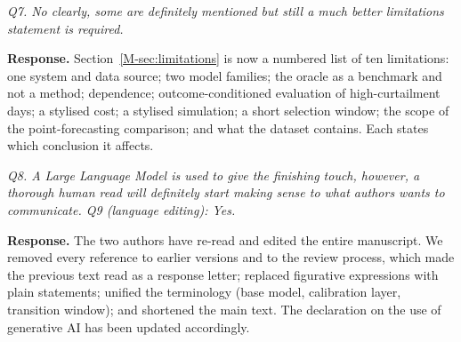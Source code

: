 \documentclass[11pt,a4paper]{article}
\newenvironment{revcomment}
  {\begin{mdframed}[backgroundcolor=quotebg,linecolor=quoterule,linewidth=0.4pt,
    innertopmargin=6pt,innerbottommargin=6pt,skipabove=8pt,skipbelow=8pt]\itshape}
  {\end{mdframed}}
\newcommand{\resp}{\textbf{Response.} }
\begin{document}
\begin{revcomment}
Q7. No clearly, some are definitely mentioned but still a much better limitations statement is required.
\end{revcomment}
\resp Section~\ref{M-sec:limitations} is now a numbered list of ten limitations: one system and data source; two model families; the oracle as a benchmark and not a method; dependence; outcome-conditioned evaluation of high-curtailment days; a stylised cost; a stylised simulation; a short selection window; the scope of the point-forecasting comparison; and what the dataset contains. Each states which conclusion it affects.

\begin{revcomment}
Q8. A Large Language Model is used to give the finishing touch, however, a thorough human read will definitely start making sense to what authors wants to communicate. Q9 (language editing): Yes.
\end{revcomment}
\resp The two authors have re-read and edited the entire manuscript. We removed every reference to earlier versions and to the review process, which made the previous text read as a response letter; replaced figurative expressions with plain statements; unified the terminology (base model, calibration layer, transition window); and shortened the main text. The declaration on the use of generative AI has been updated accordingly.
\end{document}
